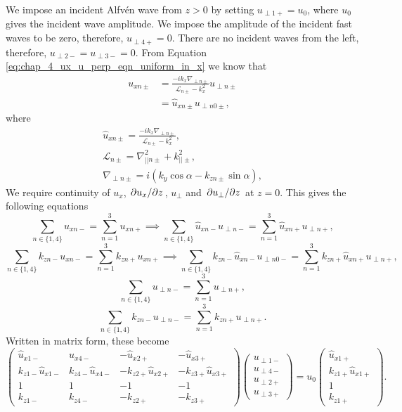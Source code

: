 We impose an incident Alfv\'en wave from $z>0$ by setting $u_{\perp1+}=u_0$, where $u_0$ gives the incident wave amplitude. We impose the amplitude of the incident fast waves to be zero, therefore, $u_{\perp 4+}=0$. There are no incident waves from the left, therefore, $u_{\perp2-}=u_{\perp3-}=0$. From Equation \eqref{eq:chap_4_ux_u_perp_eqn_uniform_in_x} we know that
\begin{equation}
    \begin{aligned}
    u_{x n\pm} &= \frac{-ik_x\nabla_{\perp n\pm}}{\mathcal{L}_{n\pm}-k_x^2}u_{\perp n\pm} \\
    &= \hat{u}_{x n\pm}u_{\perp n0\pm},
\end{aligned}
\end{equation}
where
\begin{gather}
    \hat{u}_{x n\pm} = \frac{-ik_x\nabla_{\perp n\pm}}{\mathcal{L}_{n\pm}-k_x^2}, \\
    \mathcal{L}_{n\pm}=\nabla_{||n\pm}^2+k_{||\pm}^2, \\
    \nabla_{\perp n\pm} = i(k_y\cos\alpha - k_{zn\pm}\sin\alpha),
\end{gather}
We require continuity of $u_x$, $\pdv*{u_x}{z}$, $u_\perp$ and $\pdv*{u_\perp}{z}$ at $z=0$. This gives the following equations
\[\sum_{n\in\{1,4\}}u_{xn-}=\sum_{n=1}^3u_{xn+}\implies \sum_{n\in\{1,4\}}\hat{u}_{xn-}u_{\perp n-}=\sum_{n=1}^3\hat{u}_{xn+}u_{\perp n+},\]
\[\sum_{n\in\{1,4\}}k_{zn-}u_{xn-}=\sum_{n=1}^3k_{zn+}u_{xn+}\implies \sum_{n\in\{1,4\}}k_{zn-}\hat{u}_{xn-}u_{\perp n0-}=\sum_{n=1}^3k_{zn+}\hat{u}_{xn+}u_{\perp n+},\]
\[\sum_{n\in\{1,4\}}u_{\perp n-}=\sum_{n=1}^3u_{\perp n+},\]
\[\sum_{n\in\{1,4\}}k_{zn-}u_{\perp n-}=\sum_{n=1}^3k_{zn+}u_{\perp n+}.\]
Written in matrix form, these become
\[
    \begin{pmatrix}
    \hat{u}_{x1-} & \hat{u}_{x4-} & -\hat{u}_{x2+} & -\hat{u}_{x3+} \\
    k_{z1-}\hat{u}_{x1-} & k_{z4-}\hat{u}_{x4-} & -k_{z2+}\hat{u}_{x2+} & -k_{z3+}\hat{u}_{x3+} \\
    1 & 1 & -1 &-1 \\
    k_{z1-} & k_{z4-} & -k_{z2+} & -k_{z3+}
    \end{pmatrix}
    \begin{pmatrix}
    u_{\perp 1-} \\
    u_{\perp 4-} \\
    u_{\perp 2+} \\
    u_{\perp 3+}
    \end{pmatrix}
    =u_0
    \begin{pmatrix}
    \hat{u}_{x1+} \\
    k_{z1+}\hat{u}_{x1+} \\
    1 \\
    k_{z1+}
    \end{pmatrix}.
\]
